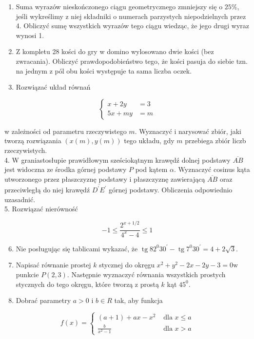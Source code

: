 \documentclass[10pt]{article}
\begin{document}
\begin{enumerate}
  \item Suma wyrazów nieskończonego ciągu geometrycznego zmniejszy się o $25 \%$, jeśli wykreślimy z niej składniki o numerach parzystych niepodzielnych przez 4. Obliczyć sumę wszystkich wyrazów tego ciągu wiedząc, że jego drugi wyraz wynosi 1.
  \item Z kompletu 28 kości do gry w domino wylosowano dwie kości (bez zwracania). Obliczyć prawdopodobieństwo tego, że kości pasuja do siebie tzn. na jednym z pól obu kości występuje ta sama liczba oczek.
  \item Rozwiązać układ równań
\end{enumerate}

$$
\left\{\begin{aligned}
x+2 y & =3 \\
5 x+m y & =m
\end{aligned}\right.
$$

w zależności od parametru rzeczywistego $m$. Wyznaczyć i narysować zbiór, jaki tworzą rozwiązania $(x(m), y(m))$ tego układu, gdy $m$ przebiega zbiór liczb rzeczywistych.\\
4. W graniastosłupie prawidłowym sześciokątnym krawędź dolnej podstawy $\overline{A B}$ jest widoczna ze środka górnej podstawy $P$ pod kątem $\alpha$. Wyznaczyć cosinus kąta utworzonego przez płaszczyznę podstawy i płaszczyznę zawierającą $\overline{A B}$ oraz przeciwległą do niej krawędź $\overline{D^{\prime} E^{\prime}}$ górnej podstawy. Obliczenia odpowiednio uzasadnić.\\
5. Rozwiązać nierówność

$$
-1 \leqslant \frac{2^{x+1 / 2}}{4^{x}-4} \leqslant 1
$$

\begin{enumerate}
  \setcounter{enumi}{5}
  \item Nie posługując się tablicami wykazać, że $\operatorname{tg} 82^{0} 30^{\prime}-\operatorname{tg} 7^{0} 30^{\prime}=4+2 \sqrt{3}$.
  \item Napisać równanie prostej $k$ stycznej do okręgu $x^{2}+y^{2}-2 x-2 y-3=0 \mathrm{w}$ punkcie $P(2,3)$. Następnie wyznaczyć równania wszystkich prostych stycznych do tego okręgu, które tworzą z prostą $k$ kąt $45^{0}$.
  \item Dobrać parametry $a>0$ i $b \in R$ tak, aby funkcja
\end{enumerate}

$$
f(x)= \begin{cases}(a+1)+a x-x^{2} & \text { dla } x \leqslant a \\ \frac{b}{x^{2}-1} & \text { dla } x>a\end{cases}
$$
\end{document}
